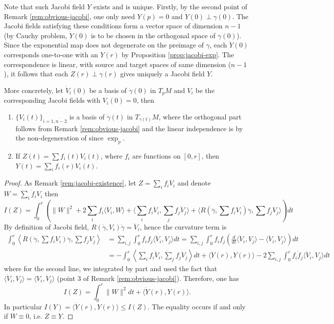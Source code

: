 \begin{remark}
\label{rem:jacobi-existence}
Note that such Jacobi field \(Y\) exists and is unique. Firstly, by the second point of Remark
\ref{rem:obvious-jacobi}, one only need \(Y(p) =0\) and \(\dot Y(0) \perp\gamma(0)\). The Jacobi fields satisfying these conditions form a vector space of dimension \(n-1\) (by Cauchy problem, \(\dot Y(0)\) is to be chosen in the orthogonal
space of \(\gamma(0)\)). Since the exponential map does not degenerate on the preimage
of \(\gamma\), each \(\dot Y(0)\) corresponds one-to-one with an \(Y(r)\) by
Proposition \ref{prop:jacobi-exp}. The correspondence is linear, with source and
target spaces of same dimension (\(n-1\)), it follows that each \(Z(r)\perp \gamma(r)\) gives uniquely a Jacobi field \(Y\).

More concretely, let \(\dot V_i(0)\) be a basis of \(\dot\gamma(0)\) in \(T_pM\) and
\(V_i\) be the corresponding Jacobi fields with \(V_i(0)=0\), then
\begin{enumerate}
\item \(\{V_i(t)\}_{i=\overline{1,n-2}}\) is a basis of \(\dot\gamma(t)\) in \(T_{\gamma(t)}M\), where the orthogonal part follows from Remark \ref{rem:obvious-jacobi}
and the linear independence is by the non-degeneration of since \(\exp_p\).
\item If \(Z(t) = \sum f_i(t)V_i(t)\), where \(f_i\) are functions on \([0,r]\), then \(Y(t) = \sum_i f_i(r)V_i(t)\).
\end{enumerate}
\end{remark}

\begin{proof}
As Remark \ref{rem:jacobi-existence}, let \(Z = \sum_i f_i V_i\) and denote \(W = \sum_i
\dot f_i V_i\) then
\[
 I(Z) = \int_0^r\left( \|W\|^2 + 2 \sum_i f_i \langle \dot V_i, W \rangle + \langle \sum_i
f_i\dot V_i,\sum_j f_j\dot V_j \rangle + \langle R(\dot\gamma,\sum f_i V_i)\dot\gamma,\sum
f_j V_j \rangle\right)dt
\]
By definition of Jacobi field, \(R(\dot\gamma, V_i)\dot\gamma = \ddot V_i\), hence the
curvature term is
\begin{equation*}
\begin{split}
\int_0^r \left\langle R(\dot\gamma,\sum f_i V_i)\dot\gamma,\sum f_j V_j \right\rangle &=\sum_{i,j}\int _0^r f_i f_j \langle \ddot V_i, V_j \rangle dt =\sum_{i,j}\int_0^r f_if_j \left(\frac{d }{dt} \langle \dot V_i, V_j \rangle - \langle \dot V_i,\dot V_j \rangle\right)dt\\
			 	       &= -\int_0^r \left\langle \sum_i f_i \dot V_i,\sum_j f_j \dot V_j \right\rangle dt + \langle \dot Y(r), Y(r) \rangle - 2\sum_{i,j}\int_0^r f_i\dot f_j \langle \dot V_i,V_j \rangle dt
\end{split}   
\end{equation*}
where for the second line, we integrated by part and used the fact that
\(\langle \dot V_i, V_j \rangle = \langle V_i, \dot V_j \rangle\) (point 3 of Remark
\ref{rem:obvious-jacobi}). Therefore, one has
\[
 I(Z) = \int_0^r \|W\|^2dt + \langle \dot Y(r), Y(r) \rangle.
\]
In particular \(I(Y) = \langle \dot Y(r), Y(r) \rangle \leq I(Z)\). The equality occurs
if and only if \(W\equiv 0\), i.e. \(Z\equiv Y\).
\end{proof}

